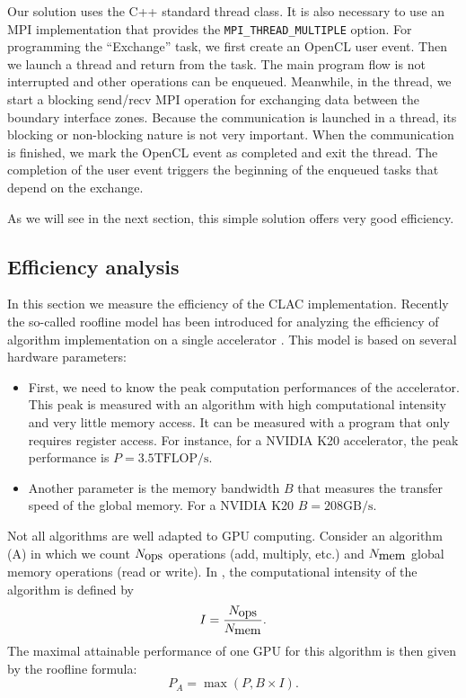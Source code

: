 \documentclass[preprint]{sig-alternate}
\begin{document}
Our solution uses the C++ standard thread class. It is also necessary to use an MPI implementation that provides the
\texttt{MPI\_THREAD\_MULTIPLE}
 option.
 For programming the ``Exchange'' task, we first create an OpenCL user event.
 Then we launch a thread and return from the task.
 The main program flow is not interrupted and other operations can be enqueued. Meanwhile, in the thread, we start a blocking send/recv MPI operation for exchanging  data between the boundary interface zones.
 Because the communication is launched in a thread, its blocking or non-blocking nature is not very important.
 When the communication is finished, we mark the OpenCL event as completed and exit the thread.
 The completion of the user event  triggers the beginning of the enqueued tasks that depend on the exchange.

As we will see in the next section, this simple solution offers very
good efficiency.

\subsection{Efficiency analysis}
In this section we  measure the efficiency of the CLAC implementation. Recently the so-called roofline model has been introduced for analyzing the efficiency of algorithm implementation on a single accelerator \cite{williams2009roofline}. This model is based on several hardware parameters:
\begin{itemize}
\item First, we need to know the peak computation performances of the accelerator. This peak is measured with an algorithm with high computational intensity and very little memory access. It can be measured with a program that only requires register access. For instance, for a NVIDIA K20 accelerator, the peak performance is  $P=3.5\text{TFLOP/s}.$
\item Another parameter is the memory bandwidth $B$ that measures the transfer speed of the global memory. For a NVIDIA K20  $B=208\text{GB/s}.$\end{itemize}


Not all algorithms are well adapted to GPU computing. Consider an algorithm (A) in which we count $N_{\hbox{ops}}$ operations (add, multiply, etc.) and $N_{\hbox{mem}}$ global memory operations (read or write). In \cite{williams2009roofline}, the computational intensity of the algorithm is defined by
$$I=\frac{N_{\hbox{ops}}}{N_{\hbox{mem}}}.$$
The maximal attainable performance of one GPU for this algorithm is then given by the roofline formula:
\[
P_{A}=\max(P,B\times I).
\]
\end{document}
